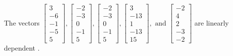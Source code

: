 \begin{exercise}
\begin{exerciseStatement}
  \end{exerciseStatement}
  \begin{exerciseAnswer}
   The vectors \(\left[\begin{array}{r}
3 \\
-6 \\
-1 \\
-5 \\
5
\end{array}\right] , \left[\begin{array}{r}
-2 \\
-3 \\
0 \\
-1 \\
5
\end{array}\right] , \left[\begin{array}{r}
-2 \\
-3 \\
0 \\
-1 \\
5
\end{array}\right] , \left[\begin{array}{r}
3 \\
-13 \\
1 \\
-13 \\
15
\end{array}\right] , \text{ and } \left[\begin{array}{r}
-2 \\
4 \\
2 \\
-3 \\
-2
\end{array}\right]\) are 
  	 linearly dependent  .
  


  \end{exerciseAnswer}
\end{exercise}